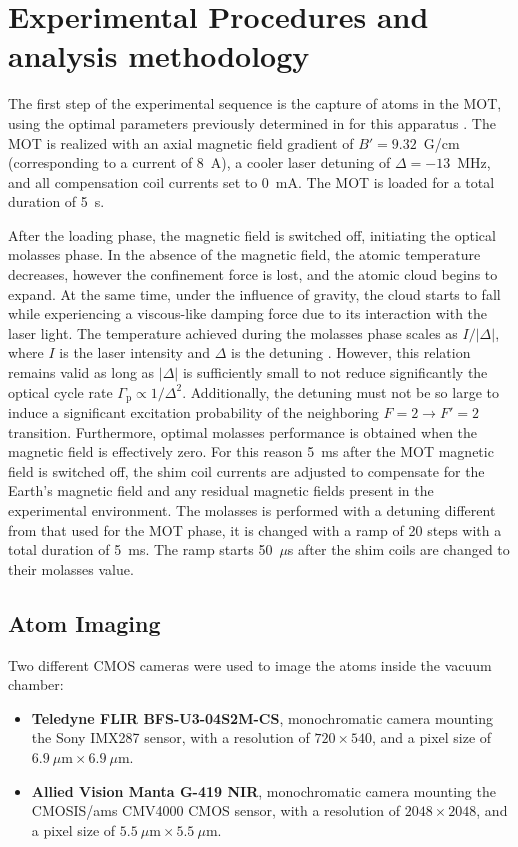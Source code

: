 \section{Experimental Procedures and analysis methodology}

The first step of the experimental sequence is the capture of atoms in the MOT, using the optimal parameters previously determined in   for this apparatus \cite{loparcomasters2024}.
The MOT is realized with an axial magnetic field gradient of $B'= 9.32$~G/cm (corresponding to a current of 8~A), a cooler laser detuning of $\Delta=-13$~MHz, and all compensation coil currents set to 0~mA. The MOT is loaded for a total duration of 5~s.

After the loading phase, the magnetic field is switched off, initiating the optical molasses phase. In the absence of the magnetic field, the atomic temperature decreases, however the confinement force is lost, and the atomic cloud begins to expand. At the same time, under the influence of gravity, the cloud starts to fall while experiencing a viscous-like damping force due to its interaction with the laser light.
The temperature achieved during the molasses phase scales as $I/|\Delta|$, where $I$ is the laser intensity and $\Delta$ is the detuning \cite{Dalibard:89}. However, this relation remains valid as long as $|\Delta|$ is sufficiently small to not reduce significantly the optical cycle rate $\Gamma_\text{p}\propto1/\Delta^2$. Additionally, the detuning must not be so large to induce a significant excitation probability of the neighboring $F=2 \rightarrow F'=2$ transition. Furthermore, optimal molasses performance is obtained when the magnetic field is effectively zero. For this reason 5~ms after the MOT magnetic field is switched off, the shim coil currents are adjusted to compensate for the Earth's magnetic field and any residual magnetic fields present in the experimental environment.
The molasses is performed with a detuning different from that used for the MOT phase, it is changed with a ramp of 20 steps with a total duration of 5~ms. The ramp starts 50~$\mu$s after the shim coils are changed to their molasses value. 

\subsection{Atom Imaging}
Two different CMOS cameras were used to image the atoms inside the vacuum chamber:
\begin{itemize}
    \item \textbf{Teledyne FLIR BFS-U3-04S2M-CS}, monochromatic camera mounting the Sony IMX287 sensor, with a resolution of $720\times 540$, and a pixel size of $6.9~\mu\mathrm{m}\times6.9~\mu\mathrm{m}$.
    \item \textbf{Allied Vision Manta G-419 NIR}, monochromatic camera mounting the CMOSIS/ams CMV4000 CMOS sensor, with a resolution of $2048 \times 2048$, and a pixel size of $5.5~\mu\mathrm{m}\times5.5~\mu\mathrm{m}$.
\end{itemize}

